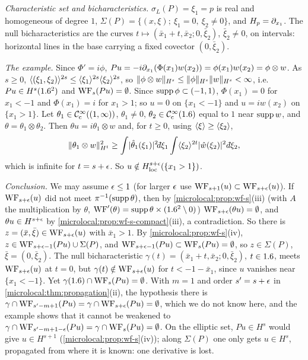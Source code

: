 \subsection*{}
\emph{Characteristic set and bicharacteristics.} $\sigma_L(P)=\xi_1=p$ is real and homogeneous of
degree $1$, $\Sigma(P)=\{(x,\xi);\ \xi_1=0,\ \xi_2\ne0\}$, and $H_{p}=\partial_{x_1}$. The null
bicharacteristics are the curves $t\mapsto(\bar x_1+t,\bar x_2;0,\bar\xi_2)$, $\bar\xi_2\ne0$, on
intervals: horizontal lines in the base carrying a fixed covector $(0,\bar\xi_2)$.

\emph{The example.} Since $\Phi'=i\phi$, $Pu=-i\partial_{x_1}(\Phi(x_1)w(x_2))=\phi(x_1)w(x_2)=\phi\otimes w$. As
$s\ge0$, $\langle (\xi_1,\xi_2)\rangle^{2s}\le\langle \xi_1\rangle^{2s}\langle \xi_2\rangle^{2s}$, so
$\lVert \phi\otimes w\rVert_{H^s}\le\lVert \phi\rVert_{H^s}\lVert w\rVert_{H^s}<\infty$, i.e.\ $Pu\in H^s(1.6^2)$ and
$\operatorname{WF}_s(Pu)=\emptyset$. Since $\operatorname{supp}\phi\subset(-1,1)$, $\Phi(x_1)=0$ for $x_1<-1$ and $\Phi(x_1)=i$ for
$x_1>1$; so $u=0$ on $\{x_1<-1\}$ and $u=iw(x_2)$ on $\{x_1>1\}$. Let $\theta_1\in\mathcal{C}^\infty_{\mathrm{c}}((1,\infty))$,
$\theta_1\ne0$, $\theta_2\in\mathcal{C}^\infty_{\mathrm{c}}(1.6)$ equal to $1$ near $\operatorname{supp} w$, and $\theta=\theta_1\otimes\theta_2$. Then
$\theta u=i\theta_1\otimes w$ and, for $t\ge0$, using $\langle \xi\rangle\ge\langle \xi_2\rangle$,
\begin{equation*}
  \norm{\theta_1\otimes w}_{H^t}^2\ge\int\abs{\hat\theta_1(\xi_1)}^2\dbar\xi_1\int\ang{\xi_2}^{2t}\abs{\hat w(\xi_2)}^2\,\dbar\xi_2,
\end{equation*}
which is infinite for $t=s+\epsilon$. So $u\notin H^{s+\epsilon}_{\mathrm{loc}}(\{x_1>1\})$.

\emph{Conclusion.} We may assume $\epsilon\le1$ (for larger $\epsilon$ use $\operatorname{WF}_{s+1}(u)\subset\operatorname{WF}_{s+\epsilon}(u)$).
If $\operatorname{WF}_{s+\epsilon}(u)$ did not meet $\pi^{-1}(\operatorname{supp}\theta)$, then by \cref{microlocal:prop:wf-s}(iii) (with $A$ the
multiplication by $\theta$, $\operatorname{WF}'(\theta)=\operatorname{supp}\theta\times(1.6^2\setminus0)$) $\operatorname{WF}_{s+\epsilon}(\theta u)=\emptyset$, and
$\theta u\in H^{s+\epsilon}$ by \cref{microlocal:prop:wf-s-compact}(iii), a contradiction. So there is
$z=(\bar x,\bar\xi)\in\operatorname{WF}_{s+\epsilon}(u)$ with $\bar x_1>1$. By \cref{microlocal:prop:wf-s}(iv),
$z\in\operatorname{WF}_{s+\epsilon-1}(Pu)\cup\Sigma(P)$, and $\operatorname{WF}_{s+\epsilon-1}(Pu)\subset\operatorname{WF}_s(Pu)=\emptyset$, so $z\in\Sigma(P)$,
$\bar\xi=(0,\bar\xi_2)$. The null bicharacteristic $\gamma(t)=(\bar x_1+t,\bar x_2;0,\bar\xi_2)$, $t\in1.6$,
meets $\operatorname{WF}_{s+\epsilon}(u)$ at $t=0$, but $\gamma(t)\notin\operatorname{WF}_{s+\epsilon}(u)$ for $t<-1-\bar x_1$, since $u$ vanishes
near $\{x_1<-1\}$. Yet $\gamma(1.6)\cap\operatorname{WF}_s(Pu)=\emptyset$. With $m=1$ and order $s'=s+\epsilon$ in
\cref{microlocal:thm:propagation}(ii), the hypothesis there is
$\gamma\cap\operatorname{WF}_{s'-m+1}(Pu)=\gamma\cap\operatorname{WF}_{s+\epsilon}(Pu)=\emptyset$, which we do not know here, and the example shows
that it cannot be weakened to $\gamma\cap\operatorname{WF}_{s'-m+1-\epsilon}(Pu)=\gamma\cap\operatorname{WF}_s(Pu)=\emptyset$. On the elliptic set, $Pu\in H^s$
would give $u\in H^{s+1}$ (\cref{microlocal:prop:wf-s}(iv)); along $\Sigma(P)$ one only gets
$u\in H^{s}$, propagated from where it is known: one derivative is lost.

